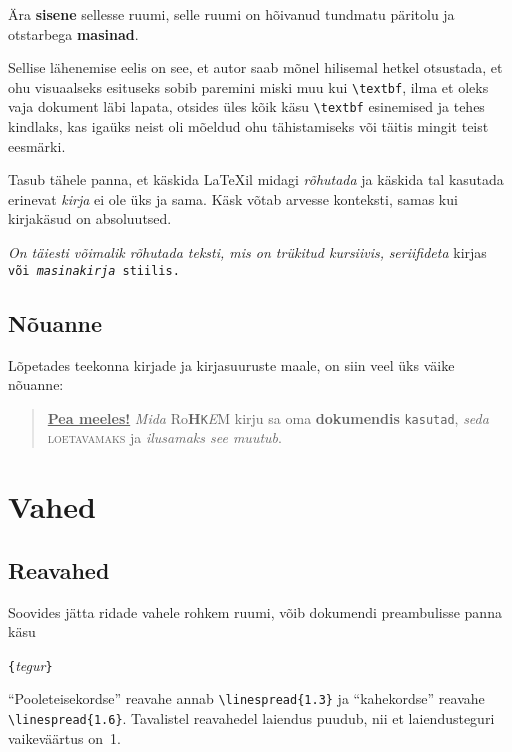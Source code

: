 \begin{example}
\newcommand{\ups}[1]{%
 \textbf{#1}}
Ära \ups{sisene} sellesse ruumi,
selle ruumi on hõivanud tundmatu
päritolu ja otstarbega
\ups{masinad}.
\end{example}

Sellise lähenemise eelis on see, et autor saab mõnel hilisemal hetkel
otsustada, et ohu visuaalseks esituseks sobib paremini miski muu kui
\verb|\textbf|, ilma et oleks vaja dokument läbi lapata, otsides üles
kõik käsu \verb|\textbf| esinemised ja tehes kindlaks, kas igaüks neist
oli mõeldud ohu tähistamiseks või täitis mingit teist eesmärki.

Tasub tähele panna, et käskida \LaTeX il midagi \emph{rõhutada} ja
käskida tal kasutada erinevat \textit{kirja} ei ole üks ja sama. Käsk
 võtab arvesse konteksti, samas kui kirjakäsud on absoluutsed.

\begin{example}
\textit{On täiesti võimalik
  \emph{rõhutada} teksti, mis
  on trükitud kursiivis,}
\textsf{%
  \emph{seriifideta} kirjas}
\texttt{või
  \emph{masinakirja} stiilis.}
\end{example}

\subsection{Nõuanne}

Lõpetades teekonna kirjade ja kirjasuuruste maale, on siin veel
üks väike nõuanne:

\begin{quote}
  \underline{\textbf{Pea meeles\Huge!}} \textit{Mida}
  \textsf{Ro\textbf{\LARGE H}\texttt{K}\textsl{E}M} kirju \Huge sa
  \tiny oma \footnotesize \textbf{dokumendis} \small \texttt{kasutad},
  \large \textit{seda} \textsc{loetavamaks} ja
  \textsl{\textsf{ilusamaks} see mu\large u\Large t\LARGE u\huge b}.
\end{quote}

\section{Vahed}

\subsection{Reavahed}

 Soovides jätta ridade vahele rohkem ruumi,
võib dokumendi preambulisse panna käsu
\begin{lscommand}
\verb|{|\emph{tegur}\verb|}|
\end{lscommand}
\noindent "`Pooleteisekordse"' reavahe annab \verb|\linespread{1.3}| ja
"`kahekordse"' reavahe \verb|\linespread{1.6}|. Tavalistel reavahedel
laiendus puudub, nii et laiendusteguri vaikeväärtus
on~1.

